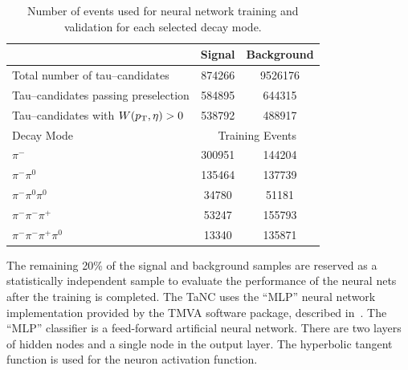 \begin{table}
   \centering
   \begin{tabular}{lcc}
                                                & Signal        & Background    \\
      \hline
      Total number of tau--candidates           & 874266        & 9526176       \\
      Tau--candidates passing preselection      & 584895        & 644315        \\
      Tau--candidates with $W(p_{\mathrm{T}},\eta)>0$      & 538792        & 488917        \\
      \hline
      Decay Mode                        & \multicolumn{2}{c}{Training Events}   \\
      \hline
      $\pi^{-}$                         & 300951   & 144204                     \\
      $\pi^{-}\pi^0$                    & 135464   & 137739                     \\
      $\pi^{-}\pi^0\pi^0$               & 34780    & 51181                      \\
      $\pi^{-}\pi^{-}\pi^{+}$           & 53247    & 155793                     \\
      $\pi^{-}\pi^{-}\pi^{+}\pi^0$      & 13340    & 135871                     \\
   \end{tabular}
   \label{tab:trainingEvents} \caption[Neural network training event
   statistics]{Number of events used for neural network training and validation
   for each selected decay mode.}
\end{table}

The remaining 20\% of the signal and background samples are
reserved as a statistically independent sample to evaluate the performance of
the neural nets after the training is completed.  The TaNC uses the ``MLP''
neural network implementation provided by the TMVA software package, described
in~\cite{TMVA}.  The ``MLP'' classifier is a feed-forward artificial neural
network. There are two layers of hidden nodes and a single node in the output
layer.  The hyperbolic tangent function is used for the neuron activation
function.  

